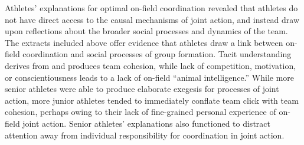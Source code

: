 \begin{CJK}{UTF8}{gbsn}
Athletes' explanations for optimal on-field coordination revealed that athletes do not have direct access to the causal mechanisms of joint action, and instead draw upon reflections about the broader social processes and dynamics of the team.  The extracts included above offer evidence that athletes draw a link between on-field coordination and social processes of group formation.  Tacit understanding derives from and produces team cohesion, while lack of competition, motivation, or conscientiousness leads to a lack of on-field ``animal intelligence.''  While more senior athletes were able to produce elaborate exegesis for processes of joint action, more junior athletes tended to immediately conflate team click with team cohesion, perhaps owing to their lack of fine-grained personal experience of on-field joint action.  Senior athletes' explanations also functioned to distract attention away from individual responsibility for coordination in joint action.

















\end{CJK}
